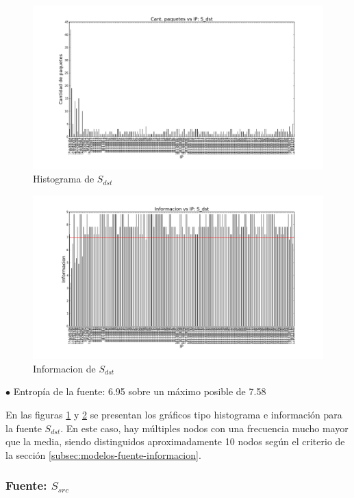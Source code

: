 \begin{figure}[H]\centering
    \includegraphics[width=\linewidth]{../imgs/red-entrepiso-dc_S_dst_hist.png}
    \caption{Histograma de $S_{dst}$}\label{fig:entrepiso-dc-dst-hist}
\end{figure}

\begin{figure}[H]\centering
    \includegraphics[width=\linewidth]{../imgs/red-entrepiso-dc_S_dst_info.png}
    \caption{Informacion de $S_{dst}$}\label{fig:entrepiso-dc-dst-info}
\end{figure}

$\bullet$ Entropía de la fuente: 6.95 sobre un máximo posible de 7.58

En las figuras \ref{fig:entrepiso-dc-dst-hist} y \ref{fig:entrepiso-dc-dst-info} se presentan los gráficos tipo histograma e información para la fuente $S_{dst}$. En este caso, hay múltiples nodos con una frecuencia mucho mayor que la media, siendo distinguidos aproximadamente 10 nodos según el criterio de la sección \ref{subsec:modelos-fuente-informacion}.

\subsubsection{Fuente: $S_{src}$}

